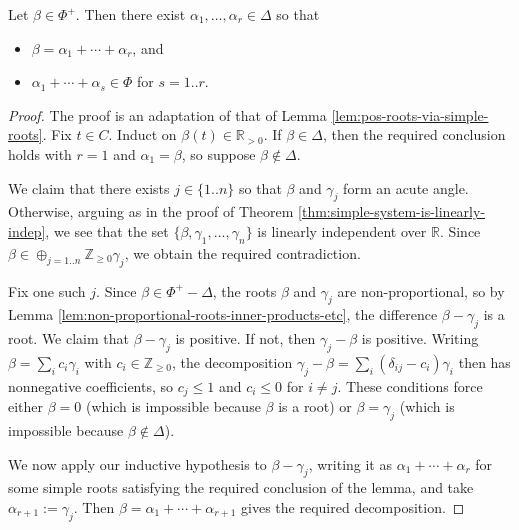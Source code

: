 \documentclass[reqno]{amsart} 
\begin{document}
\begin{lemma}\label{lem:roots-partial-sums}
  Let $\beta \in \Phi^+$.  Then there exist $\alpha_1,\dotsc,\alpha_r \in \Delta$ so that
  \begin{itemize}
  \item $\beta = \alpha_1 + \dotsb + \alpha_r$, and
  \item $\alpha_1 + \dotsb + \alpha_s \in \Phi$ for $s=1..r$.
  \end{itemize}
\end{lemma}
\begin{proof}
  The proof is an adaptation of that of Lemma \ref{lem:pos-roots-via-simple-roots}.  Fix $t \in C$.  Induct on $\beta(t) \in \mathbb{R}_{>0}$.  If $\beta \in \Delta$, then the required conclusion holds with $r = 1$ and $\alpha_1 = \beta$, so suppose $\beta \notin \Delta$.

  We claim that there exists $j \in \{1..n\}$ so that $\beta$ and $\gamma_j$ form an acute angle.  Otherwise, arguing as in the proof of Theorem \ref{thm:simple-system-is-linearly-indep}, we see that the set $\{\beta, \gamma_1, \dotsc, \gamma_n\}$ is linearly independent over $\mathbb{R}$.  Since $\beta \in \oplus_{j=1..n} \mathbb{Z}_{\geq 0} \gamma_j$, we obtain the required contradiction.

  Fix one such $j$.  Since $\beta \in \Phi^+ - \Delta$, the roots $\beta$ and $\gamma_j$ are non-proportional, so by Lemma \ref{lem:non-proportional-roots-inner-products-etc}, the difference $\beta - \gamma_j$ is a root.  We claim that $\beta - \gamma_j$ is positive.  If not, then $\gamma_j - \beta$ is positive.  Writing $\beta = \sum_i c_i \gamma_i$ with $c_i \in \mathbb{Z}_{\geq 0}$, the decomposition $\gamma _j - \beta = \sum_i (\delta_{i j} - c_i) \gamma_i$ then has nonnegative coefficients, so $c_j \leq 1$ and $c_i \leq 0$ for $i \neq j$.  These conditions force either $\beta = 0$ (which is impossible because $\beta$ is a root) or $\beta = \gamma_j$ (which is impossible because $\beta \notin \Delta$).

  We now apply our inductive hypothesis to $\beta - \gamma_j$, writing it as $\alpha_1 + \dotsb + \alpha_r$ for some simple roots satisfying the required conclusion of the lemma, and take $\alpha_{r+1} := \gamma_j$.  Then $\beta = \alpha_1 + \dotsb + \alpha_{r+1}$ gives the required decomposition.
\end{proof}
\end{document}
